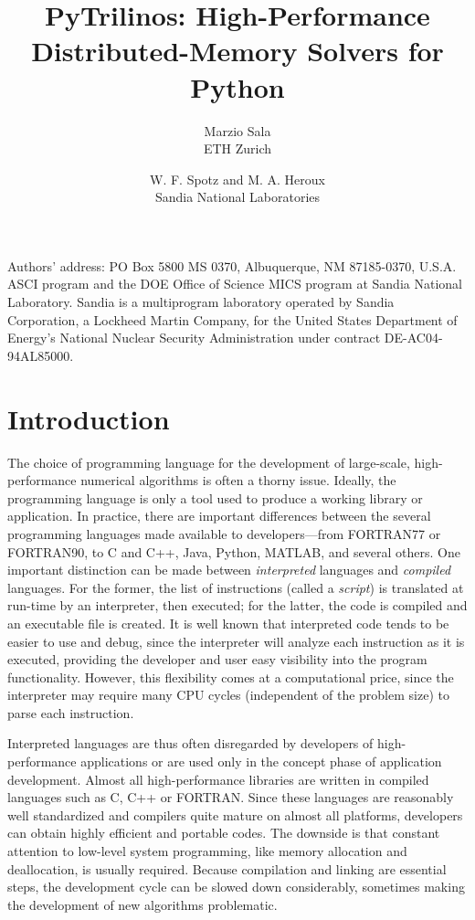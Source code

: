 \documentclass[acmtocl]{acmtrans2m}
\title{PyTrilinos: High-Performance Distributed-Memory Solvers for
       Python}
\author{Marzio Sala                       \\ ETH Zurich
        \and W. F. Spotz and M. A. Heroux \\ Sandia National Laboratories}
\begin{document}
\setcounter{page}{1}

\begin{bottomstuff}
Authors' address: PO Box 5800 MS 0370, Albuquerque, NM 87185-0370,
U.S.A.\newline
ASCI program and the DOE Office of Science MICS program at Sandia
National Laboratory.  Sandia is a multiprogram laboratory operated by
Sandia Corporation, a Lockheed Martin Company, for the United States
Department of Energy's National Nuclear Security Administration under
contract DE-AC04-94AL85000.
\end{bottomstuff}

\maketitle

\section{Introduction}
\label{sec:intro}

The choice of programming language for the development of
large-scale, high-performance numerical algorithms is often a thorny
issue. Ideally, the programming language is only a tool used to
produce a working library or application.  In practice, there are
important differences between the several programming languages made
available to developers---from FORTRAN77 or FORTRAN90, to C and C++,
Java, Python, MATLAB, and several others.  One important distinction
can be made between {\sl interpreted} languages and {\sl compiled}
languages. For the former, the list of instructions (called a {\sl
script}) is translated at run-time by an interpreter, then executed;
for the latter, the code is compiled and an executable file is
created. It is well known that interpreted code tends to be easier
to use and debug, since the interpreter will analyze each
instruction as it is executed, providing the developer and user easy
visibility into the program functionality. However, this flexibility
comes at a computational price, since the interpreter may require
many CPU cycles (independent of the problem size) to parse each
instruction.

Interpreted languages are thus often disregarded by developers of
high-performance applications or are used only in the concept phase
of application development.  Almost all high-performance libraries
are written in compiled languages such as C, C++ or FORTRAN.  Since
these languages are reasonably well standardized and compilers quite
mature on almost all platforms, developers can obtain highly
efficient and portable codes.  The downside is that constant
attention to low-level system programming, like memory allocation
and deallocation, is usually required.  Because compilation and
linking are essential steps, the development cycle can be slowed
down considerably, sometimes making the development of new
algorithms problematic.
\end{document}
